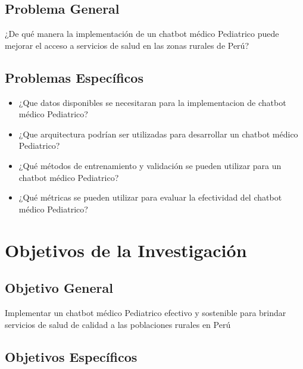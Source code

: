 
\subsection{Problema General}
\newcommand{\ProblemaGeneral}{
¿De qué manera la implementación de un chatbot médico Pediatrico puede mejorar el acceso a servicios de salud en las zonas rurales de Perú?
}
\ProblemaGeneral
\subsection{Problemas Espec\'{i}ficos}
\newcommand{\Pbone}{
¿Que datos disponibles se necesitaran para la implementacion de chatbot médico Pediatrico?
}
\newcommand{\Pbtwo}{
¿Que arquitectura podrían ser utilizadas para desarrollar un chatbot médico Pediatrico?
}
\newcommand{\Pbthree}{
¿Qué métodos de entrenamiento y validación se pueden utilizar para un chatbot médico Pediatrico?
}
\newcommand{\Pbfour}{
¿Qué métricas se pueden utilizar para evaluar la efectividad del chatbot médico Pediatrico?
}


\begin{itemize}
	\item \Pbone
	\item \Pbtwo
	\item \Pbthree
	\item \Pbfour

\end{itemize}

\section{Objetivos de la Investigación}

\subsection{Objetivo General}
\newcommand{\ObjetivoGeneral}{
Implementar un chatbot médico Pediatrico efectivo y sostenible para brindar servicios de salud de calidad a las poblaciones rurales en Perú
}
\ObjetivoGeneral
\subsection{Objetivos Espec\'{i}ficos}
\newcommand{\Objone}{
Identificar los datos disponibles y necesarios para la implementación del chatbot médico Pediatrico en áreas rurales de Perú.
}
\newcommand{\Objtwo}{
Explorar las diferentes arquitecturas disponibles para el desarrollo del chatbot médico Pediatrico.
}
\newcommand{\Objthree}{
Investigar métodos de entrenamiento y validación adecuados para un chatbot médico Pediatrico.
}
\newcommand{\Objfour}{
Definir métricas de evaluación para medir la efectividad y el impacto del chatbot médico Pediatrico en la prestación de servicios de la salud.
}

